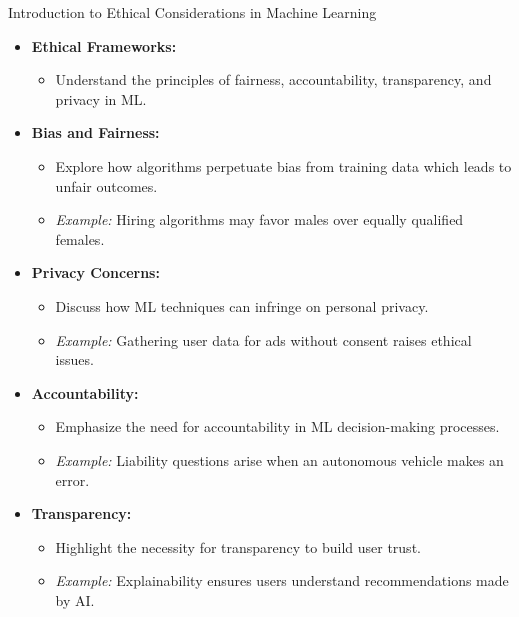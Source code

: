 \documentclass[aspectratio=169]{beamer}
\begin{document}
\begin{frame}[fragile]{Introduction to Ethical Considerations in Machine Learning}
    \begin{itemize}
        \item \textbf{Ethical Frameworks:}
            \begin{itemize}
                \item Understand the principles of fairness, accountability, transparency, and privacy in ML.
            \end{itemize}
        \item \textbf{Bias and Fairness:}
            \begin{itemize}
                \item Explore how algorithms perpetuate bias from training data which leads to unfair outcomes.
                \item \textit{Example:} Hiring algorithms may favor males over equally qualified females.
            \end{itemize}
        \item \textbf{Privacy Concerns:}
            \begin{itemize}
                \item Discuss how ML techniques can infringe on personal privacy.
                \item \textit{Example:} Gathering user data for ads without consent raises ethical issues.
            \end{itemize}
        \item \textbf{Accountability:}
            \begin{itemize}
                \item Emphasize the need for accountability in ML decision-making processes.
                \item \textit{Example:} Liability questions arise when an autonomous vehicle makes an error.
            \end{itemize}
        \item \textbf{Transparency:}
            \begin{itemize}
                \item Highlight the necessity for transparency to build user trust.
                \item \textit{Example:} Explainability ensures users understand recommendations made by AI.
            \end{itemize}
    \end{itemize}
\end{frame}
\end{document}
